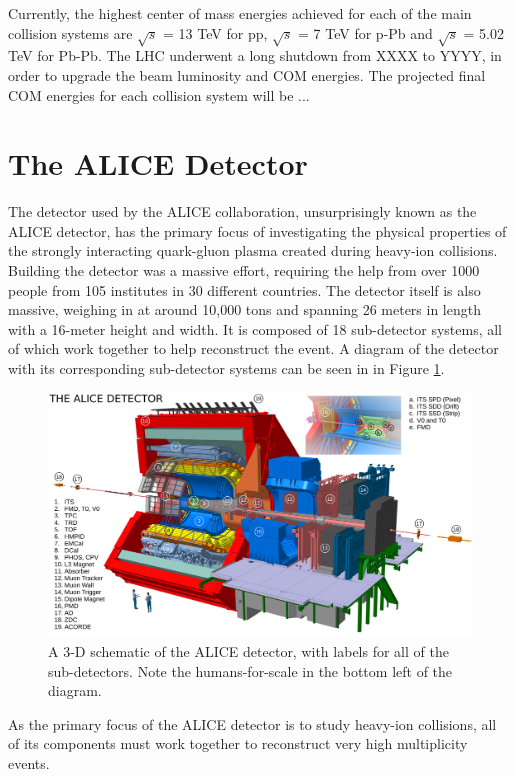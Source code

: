 Currently, the highest center of mass energies achieved for each of the main collision systems are $\sqrt{s}$ = 13 TeV for pp, $\sqrt{s}$ = 7 TeV for p-Pb and $\sqrt{s}$ = 5.02 TeV for Pb-Pb. 
The LHC underwent a long shutdown from XXXX to YYYY, in order to upgrade the beam luminosity and COM energies. 
The projected final COM energies for each collision system will be ... 
\section{The ALICE Detector}
The detector used by the ALICE collaboration, unsurprisingly known as the ALICE detector, has the primary focus of investigating the physical properties of the strongly interacting quark-gluon plasma created during heavy-ion collisions.
Building the detector was a massive effort, requiring the help from over 1000 people from 105 institutes in 30 different countries. 
The detector itself is also massive, weighing in at around 10,000 tons and spanning 26 meters in length with a 16-meter height and width.
It is composed of 18 sub-detector systems, all of which work together to help reconstruct the event.
A diagram of the detector with its corresponding sub-detector systems can be seen in in Figure \ref{fig:alice_detector}.
\begin{figure}
    \centering
    \includegraphics[scale=0.2]{figures/experiment/ALICE_detector_schematic.png}
    \caption{A 3-D schematic of the ALICE detector, with labels for all of the sub-detectors. Note the humans-for-scale in the bottom left of the diagram.}
    \label{fig:alice_detector}
\end{figure}
As the primary focus of the ALICE detector is to study heavy-ion collisions, all of its components must work together to reconstruct very high multiplicity events. 

